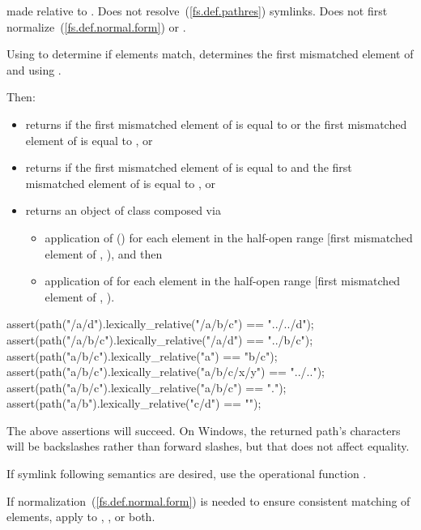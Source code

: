 \begin{itemdescr}
\pnum
\returns {} made relative to .
Does not resolve~(\ref{fs.def.pathres}) symlinks.
Does not first normalize~(\ref{fs.def.normal.form})  or .

\pnum
\effects
Using  to determine if elements match,
determines the first mismatched element of  and 
using    .

Then:
\begin{itemize}
\item returns  if
  the first mismatched element of  is equal to  or
  the first mismatched element of  is equal to , or
\item returns  if
  the first mismatched element of  is equal to  and
  the first mismatched element of  is equal to , or
\item returns an object of class  composed via
\begin{itemize}
\item application of  ()
  for each element in the half-open range
  [first mismatched element of , ), and then
\item application of 
  for each element in the half-open range
  [first mismatched element of , ).
\end{itemize}
\end{itemize}

\begin{example}
\begin{codeblock}
assert(path("/a/d").lexically_relative("/a/b/c") == "../../d");
assert(path("/a/b/c").lexically_relative("/a/d") == "../b/c");
assert(path("a/b/c").lexically_relative("a") == "b/c");
assert(path("a/b/c").lexically_relative("a/b/c/x/y") == "../..");
assert(path("a/b/c").lexically_relative("a/b/c") == ".");
assert(path("a/b").lexically_relative("c/d") == "");
\end{codeblock}
The above assertions will succeed.
On Windows, the returned path's  characters
will be backslashes rather than forward slashes,
but that does not affect  equality.
\end{example}

\begin{note} If symlink following semantics are desired,
  use the operational function . \end{note}

\begin{note} If normalization~(\ref{fs.def.normal.form}) is needed
  to ensure consistent matching of elements,
  apply  to
  , , or both. \end{note}
\end{itemdescr}

